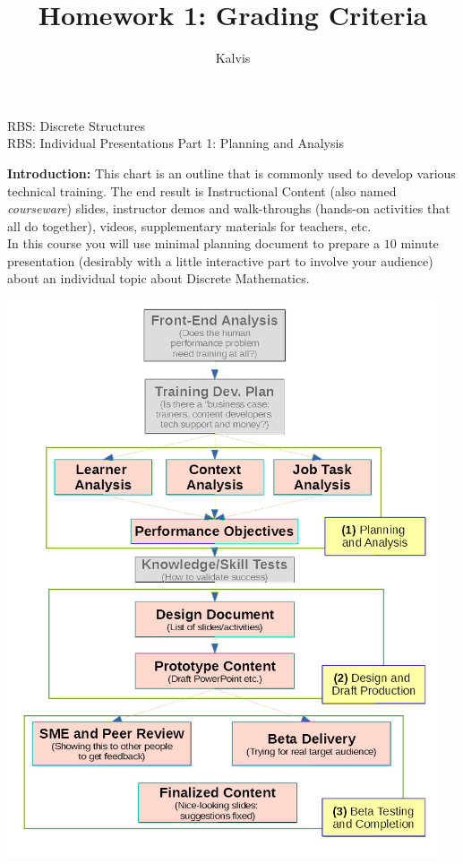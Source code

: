 \documentclass[jou]{apa6}
\title{Homework 1: Grading Criteria}
\author{Kalvis}
\affiliation{RBS}
\begin{document}
\thispagestyle{empty}


\begin{center}
{\Large RBS: Discrete Structures}\\
{\Large RBS: Individual Presentations Part 1: Planning and Analysis}
\end{center}

{\bf Introduction:} This chart is an outline that is commonly used to develop various 
technical training. The end result is Instructional Content (also named {\em courseware}) \textendash{} 
slides, instructor demos and walk-throughs (hands-on activities that all do together), 
videos, supplementary materials for teachers, etc.\\
In this course you will use minimal planning document to prepare a $10$ minute presentation 
(desirably with a little interactive part to involve your audience) 
about an individual topic about Discrete Mathematics. 

\begin{center}
\includegraphics[width=5in]{isd-process.png}
\end{center}
\end{document}
